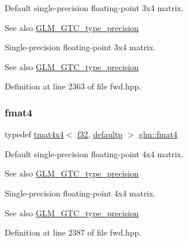 Default single-\/precision floating-\/point 3x4 matrix. \begin{DoxySeeAlso}{See also}
\mbox{\hyperlink{group__gtc__type__precision}{G\+L\+M\+\_\+\+G\+T\+C\+\_\+type\+\_\+precision}}
\end{DoxySeeAlso}
Single-\/precision floating-\/point 3x4 matrix. \begin{DoxySeeAlso}{See also}
\mbox{\hyperlink{group__gtc__type__precision}{G\+L\+M\+\_\+\+G\+T\+C\+\_\+type\+\_\+precision}} 
\end{DoxySeeAlso}


Definition at line 2363 of file fwd.\+hpp.

\mbox{\label{group__gtc__type__precision_ga5a7b9713c32b3e8bf6ad41fce25f3205}} 
\subsubsection{\texorpdfstring{fmat4}{fmat4}}
{\footnotesize\ttfamily typedef \mbox{\hyperlink{structglm_1_1tmat4x4}{tmat4x4}}$<$ \mbox{\hyperlink{group__gtc__type__precision_ga0ec999b57f5330d9021256e96038df04}{f32}}, \mbox{\hyperlink{namespaceglm_a0f04f086094c747d227af4425893f545a9d21ccd8b5a009ec7eb7677befc3bf51}{defaultp}} $>$ \mbox{\hyperlink{group__gtc__type__precision_ga5a7b9713c32b3e8bf6ad41fce25f3205}{glm\+::fmat4}}}

Default single-\/precision floating-\/point 4x4 matrix. \begin{DoxySeeAlso}{See also}
\mbox{\hyperlink{group__gtc__type__precision}{G\+L\+M\+\_\+\+G\+T\+C\+\_\+type\+\_\+precision}}
\end{DoxySeeAlso}
Single-\/precision floating-\/point 4x4 matrix. \begin{DoxySeeAlso}{See also}
\mbox{\hyperlink{group__gtc__type__precision}{G\+L\+M\+\_\+\+G\+T\+C\+\_\+type\+\_\+precision}} 
\end{DoxySeeAlso}


Definition at line 2387 of file fwd.\+hpp.

\mbox{\label{group__gtc__type__precision_ga9325d382b334066a4c90a814c9040359}} 
